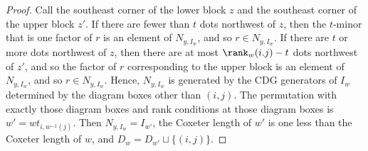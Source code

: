 \begin{proof}
Call the southeast corner of the lower block $z$ and the southeast corner of the upper block $z'$.  If there are fewer than $t$ dots northwest of $z$, then the $t$-minor that is one factor of $r$ is an element of $N_{y,I_w}$, and so $r \in  N_{y,I_w}$.  If there are $t$ or more dots northwest of $z$, then there are at most $\rank_w(i.j)-t$ dots northwest of $z'$, and so the factor of $r$ corresponding to the upper block is an element of $N_{y,I_w}$, and so $r \in N_{y,I_w}$.  Hence, $N_{y,I_w}$ is generated by the CDG generators of $I_w$ determined by the diagram boxes other than $(i,j)$.  The permutation with exactly those diagram boxes and rank conditions at those diagram boxes is $w' = wt_{i,w^{-1}(j)}$.  Then $N_{y,I_w} = I_{w'}$, the Coxeter length of $w'$ is one less than the Coxeter length of $w$, and $D_w = D_{w'} \sqcup \{(i,j)\}$.  
\end{proof}


